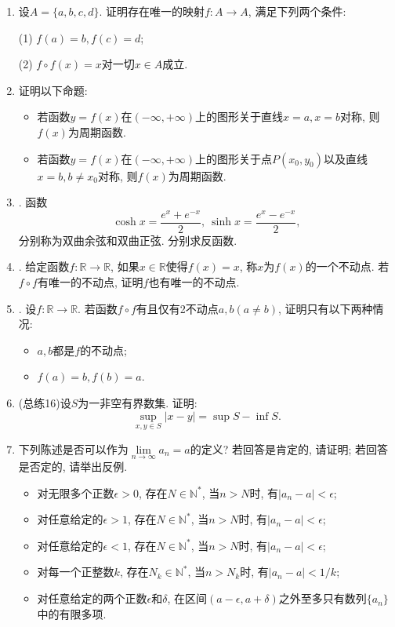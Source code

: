 \documentclass[UTF8,11pt, a4paper, oneside, fontset=none]{ctexbook}
\begin{document}
\begin{enumerate}


\item 设$A = \{ a, b, c, d\}$. 证明存在唯一的映射$f : A \to A$, 满足下列两个条件:

(1) $f(a) = b, f(c) = d$;

(2) $f \circ f(x) = x$对一切$x \in A$成立.

\item 证明以下命题:
\begin{itemize}
\item[(1)] 若函数$y = f(x) $在$(- \infty, + \infty)$上的图形关于直线$x =a, x=b$对称, 则$f(x)$为周期函数.
\item[(2)] 若函数$y = f(x) $在$(- \infty, + \infty)$上的图形关于点$P(x_0, y_0)$以及直线$x =b, b \neq x_0$对称, 则$f(x)$为周期函数.
\end{itemize}


\item. 函数
\[
\cosh x = \frac{e^x + e^{-x}}{2}, \ \sinh x = \frac{e^x - e^{-x}}{2},
\]
分别称为双曲余弦和双曲正弦. 分别求反函数.


\item. 给定函数$f : \mathbb R \to \mathbb R$, 如果$x \in \mathbb R$使得$f(x) =x$, 称$x$为$f(x)$的一个不动点. 若$f \circ f$有唯一的不动点, 证明$f$也有唯一的不动点.


\item. 设$f : \mathbb R \to \mathbb R$. 若函数$f\circ f$有且仅有2不动点$a, b (a \neq b)$, 证明只有以下两种情况:
\begin{itemize}
\item[(1)] $a, b$都是$f$的不动点;
\item[(2)] $f(a)=b, f(b) =a$.
\end{itemize}


\item (总练16)设$S$为一非空有界数集. 证明:
\[
\sup_{x,y\in S}|x - y| = \sup S - \inf S.
\]

\item 下列陈述是否可以作为$\lim\limits_{n \to \infty} a_n = a$的定义? 若回答是肯定的, 请证明; 若回答是否定的, 请举出反例.

\begin{itemize}
\item[(1)] 对无限多个正数$\epsilon>0$, 存在$N \in \mathbb N^*$, 当$n >N$时, 有$|a_n - a|< \epsilon$;
\item[(2)] 对任意给定的$\epsilon >1$, 存在$N \in \mathbb N^*$, 当$n >N$时, 有$|a_n - a|< \epsilon$;
\item[(3)] 对任意给定的$\epsilon <1$, 存在$N \in \mathbb N^*$, 当$n >N$时, 有$|a_n - a|< \epsilon$;
\item[(4)] 对每一个正整数$k$, 存在$N_k \in \mathbb N^*$, 当$n >N_k$时, 有$|a_n - a|< 1/k$;
\item[(5)] 对任意给定的两个正数$\epsilon$和$\delta$, 在区间$(a-\epsilon, a+\delta)$之外至多只有数列$\{ a_n \}$中的有限多项.
\end{itemize}


\end{enumerate}
\end{document}
